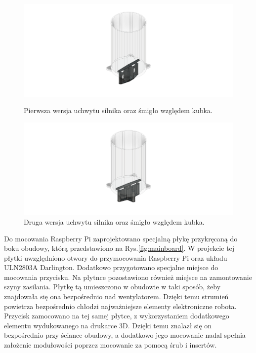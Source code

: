 \begin{figure}[H]
    \centering
    \begin{minipage}{0.48\textwidth}
        \centering
        \includegraphics[width=\linewidth]{chapters/03-praca-wlasna/figures/uchwyt_v1.png}
        \caption{\label{fig:uchwyt_v1}Pierwsza wersja uchwytu silnika oraz śmigło względem kubka.}
    \end{minipage}
    \hfill
    \begin{minipage}{0.48\textwidth}
        \centering
        \includegraphics[width=\linewidth]{chapters/03-praca-wlasna/figures/uchwyt_v2.png}
        \caption{\label{fig:uchwyt_v2}Druga wersja uchwytu silnika oraz śmigło względem kubka.}
    \end{minipage}
\end{figure}


Do mocowania Raspberry Pi zaprojektowano specjalną płykę przykręcaną do boku obudowy, którą przedstawiono na Rys.\ref{fig:mainboard}. W projekcie tej płytki uwzględniono otwory do przymocowania Raspberry
Pi oraz układu ULN2803A Darlington. Dodatkowo przygotowano specjalne miejsce do mocowania przycisku. Na płytnce pozostawiono również miejsce
na zamontowanie szyny zasilania. Płytkę tą umieszczono w obudowie w taki sposób, żeby znajdowała się ona bezpośrednio nad wentylatorem. Dzięki temu
strumień powietrza bezpośrednio chłodzi najważniejsze elementy elektroniczne robota. Przycisk zamocowano na tej samej płytce, z wykorzystaniem
dodatkowego elementu wydukowanego na drukarce 3D. Dzięki temu znalazł się on bezpośrednio przy ściance obudowy, a dodatkowo jego mocowanie
nadal spełnia założenie modułowości poprzez mocowanie za pomocą śrub i insertów.

